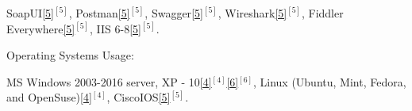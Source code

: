 \begin{cventries}
{\begin{cvitems}
{        \textcolor{rainbowcolor-olive}{SoapUI\ref{5}{$^{[5]}$}},
        \textcolor{rainbowcolor-olive}{Postman\ref{5}{$^{[5]}$}},
        \textcolor{rainbowcolor-olive}{Swagger\ref{5}{$^{[5]}$}},    
        \textcolor{rainbowcolor-olive}{Wireshark\ref{5}{$^{[5]}$}},    
        \textcolor{rainbowcolor-olive}{Fiddler Everywhere\ref{5}{$^{[5]}$}},  
        \textcolor{rainbowcolor-olive}{IIS 6-8\ref{5}{$^{[5]}$}}.%
		}
      \end{cvitems}
    }  
    
%    
%    
  \cventry
    {Operating Systems Usage:} %
    {} 
    {} 
    {} 
    {
      \vspace{0.1cm}
      \begin{cvitems} %
        \item[] {
        \textcolor{rainbowcolor-orange}{MS Windows 2003-2016 server, XP - 10\ref{4}{$^{[4]}$}\ref{6}{$^{[6]}$}}, 
        \textcolor{rainbowcolor-orange}{Linux (Ubuntu, Mint, Fedora, and OpenSuse)\ref{4}{$^{[4]}$}},
        \textcolor{rainbowcolor-orange}{CiscoIOS\ref{5}{$^{[5]}$}}.} 
      \end{cvitems}
    }  
  \vspace{-0.6cm} 
    


\end{cventries}
